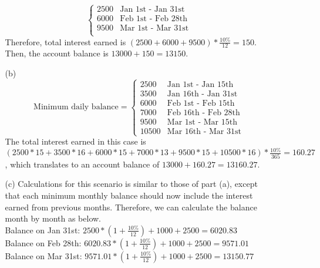 \documentclass{article}
\begin{document}
\begin{itemize}
\begin{itemize}
\[                              \begin{cases}
                                    2500 & \text{Jan 1st - Jan 31st} \\
                                    6000 & \text{Feb 1st - Feb 28th} \\
                                    9500 & \text{Mar 1st - Mar 31st} \\
                              \end{cases}
                        \]
                        Therefore, total interest earned is $(2500+6000+9500)*\frac{10\%}{12}=150$. Then, the account balance is $13000+150=\boxed{13150}$.
                  \item [(b)]
                        \[
                              \text{Minimum daily balance}=
                              \begin{cases}
                                    2500  & \text{Jan 1st - Jan 15th}  \\
                                    3500  & \text{Jan 16th - Jan 31st} \\
                                    6000  & \text{Feb 1st - Feb 15th}  \\
                                    7000  & \text{Feb 16th - Feb 28th} \\
                                    9500  & \text{Mar 1st - Mar 15th}  \\
                                    10500 & \text{Mar 16th - Mar 31st}
                              \end{cases}
                        \]
                        The total interest earned in this case is $(2500*15+3500*16+6000*15+7000*13+9500*15+10500*16)*\frac{10\%}{365}=160.27$, which translates to an account balance of $13000+160.27=\boxed{13160.27}$.
                  \item [(c)]
                        Calculations for this scenario is similar to those of part (a), except that each minimum monthly balance should now include the interest earned from previous months. Therefore, we can calculate the balance month by month as below.\\
                        Balance on Jan 31st: $2500*(1+\frac{10\%}{12})+1000+2500=6020.83$\\
                        Balance on Feb 28th: $6020.83*(1+\frac{10\%}{12})+1000+2500=9571.01$\\
                        Balance on Mar 31st: $9571.01*(1+\frac{10\%}{12})+1000+2500=\boxed{13150.77}$

\end{itemize}
\end{itemize}
\end{document}
